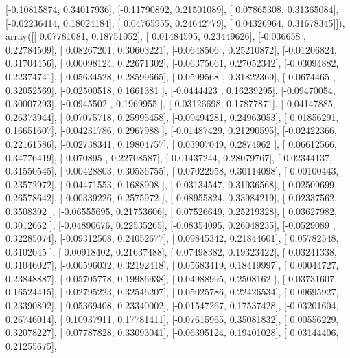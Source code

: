 \documentclass{article}
\begin{document}
       [-0.10815874,  0.34017936],
       [-0.11790892,  0.21501089],
       [ 0.07865308,  0.31365084],
       [-0.02236414,  0.18024184],
       [ 0.04765955,  0.24642779],
       [ 0.04326964,  0.31678345]]), array([[ 0.07781081,  0.18751052],
       [ 0.01484595,  0.23449626],
       [-0.036658  ,  0.22784509],
       [ 0.08267201,  0.30603221],
       [-0.0648506 ,  0.25210872],
       [-0.01206824,  0.31704456],
       [ 0.00098124,  0.22671302],
       [-0.06375661,  0.27052342],
       [-0.03094882,  0.22374741],
       [-0.05634528,  0.28599665],
       [ 0.0599568 ,  0.31822369],
       [ 0.0674465 ,  0.32052569],
       [-0.02500518,  0.1661381 ],
       [-0.0444423 ,  0.16239295],
       [-0.09470054,  0.30007293],
       [-0.0945502 ,  0.1969955 ],
       [ 0.03126698,  0.17877871],
       [ 0.04147885,  0.26373944],
       [ 0.07075718,  0.25995458],
       [-0.09494281,  0.24963053],
       [ 0.01856291,  0.16651607],
       [-0.04231786,  0.2967988 ],
       [-0.01487429,  0.21290595],
       [-0.02422366,  0.22161586],
       [-0.02738341,  0.19804757],
       [ 0.03907049,  0.2874962 ],
       [ 0.06612566,  0.34776419],
       [ 0.070895  ,  0.22708587],
       [ 0.01437244,  0.28079767],
       [ 0.02344137,  0.31550545],
       [ 0.00428803,  0.30536755],
       [-0.07022958,  0.30114098],
       [-0.00100443,  0.23572972],
       [-0.04471553,  0.1688908 ],
       [-0.03134547,  0.31936568],
       [-0.02509699,  0.26578642],
       [ 0.00339226,  0.2575972 ],
       [-0.08955824,  0.33984219],
       [ 0.02337562,  0.3508392 ],
       [-0.06555695,  0.21753606],
       [ 0.07526649,  0.25219328],
       [ 0.03627982,  0.3012662 ],
       [-0.04890676,  0.22535265],
       [-0.08354095,  0.26048235],
       [-0.0529089 ,  0.32285074],
       [-0.09312508,  0.24052677],
       [ 0.09845342,  0.21844601],
       [ 0.05782548,  0.3102045 ],
       [ 0.00918402,  0.21637488],
       [ 0.07498382,  0.19323422],
       [ 0.03241338,  0.31046027],
       [-0.00596032,  0.32192418],
       [ 0.05683419,  0.18419997],
       [ 0.00044727,  0.23848887],
       [-0.05705778,  0.19986938],
       [ 0.04988995,  0.2508162 ],
       [ 0.03731607,  0.16524415],
       [ 0.02795223,  0.32546207],
       [ 0.05025786,  0.22426534],
       [ 0.09695927,  0.23390892],
       [ 0.05369408,  0.23340002],
       [-0.01547267,  0.17537428],
       [-0.03201604,  0.26746014],
       [ 0.10937911,  0.17781411],
       [-0.07615965,  0.35081832],
       [ 0.00556229,  0.32078227],
       [ 0.07787828,  0.33093041],
       [-0.06395124,  0.19401028],
       [ 0.03144406,  0.21255675],
\end{document}
